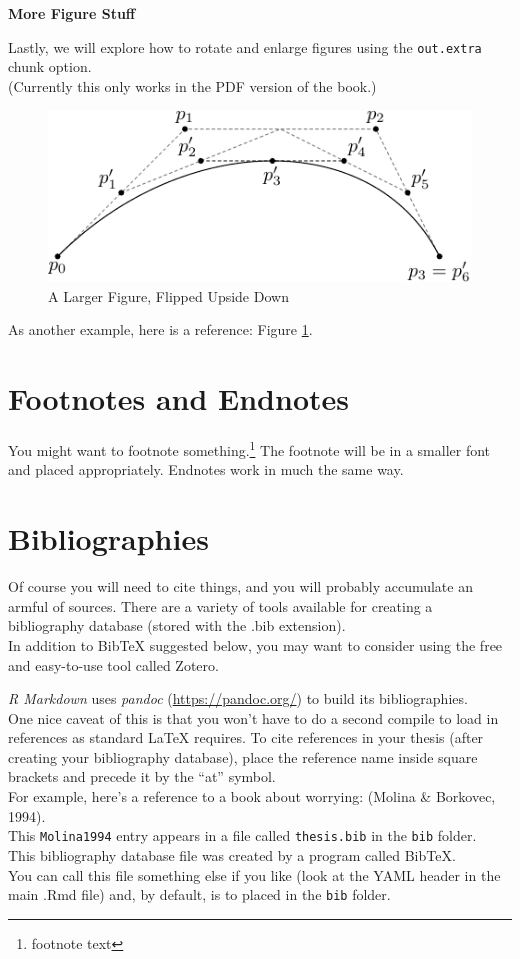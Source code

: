 \documentclass[12pt,oneside]{tisemthesis}
\begin{document}
\textbf{More Figure Stuff}

Lastly, we will explore how to rotate and enlarge figures using the \texttt{out.extra} chunk option.\\
(Currently this only works in the PDF version of the book.)
\begin{figure}
\includegraphics[angle=180, scale=1.1]{figure/subdivision} \caption{A Larger Figure, Flipped Upside Down}\label{fig:subd2}
\end{figure}
As another example, here is a reference: Figure \ref{fig:subd2}.

\hypertarget{footnotes-and-endnotes}{%
\section{Footnotes and Endnotes}\label{footnotes-and-endnotes}}

You might want to footnote something.\footnote{footnote text}
The footnote will be in a smaller font and placed appropriately. Endnotes work in much the same way.

\hypertarget{bibliographies}{%
\section{Bibliographies}\label{bibliographies}}

Of course you will need to cite things, and you will probably accumulate an armful of sources.
There are a variety of tools available for creating a bibliography database (stored with the .bib extension).\\
In addition to BibTeX suggested below, you may want to consider using the free and easy-to-use tool called Zotero.

\emph{R Markdown} uses \emph{pandoc} (\url{https://pandoc.org/}) to build its bibliographies.\\
One nice caveat of this is that you won't have to do a second compile to load in references as standard LaTeX requires.
To cite references in your thesis (after creating your bibliography database), place the reference name inside square brackets and precede it by the ``at'' symbol.\\
For example, here's a reference to a book about worrying: (Molina \& Borkovec, 1994).\\
This \texttt{Molina1994} entry appears in a file called \texttt{thesis.bib} in the \texttt{bib} folder.\\
This bibliography database file was created by a program called BibTeX.\\
You can call this file something else if you like (look at the YAML header in the main .Rmd file) and, by default, is to placed in the \texttt{bib} folder.
\end{document}

